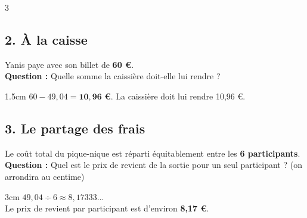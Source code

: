 \documentclass[a4paper]{book}
\begin{document}
{\begin{exerciceNote}{3}
        \subsection*{2. À la caisse}
        Yanis paye avec son billet de \textbf{60 €}. 
        \\ \textbf{Question :} Quelle somme la caissière doit-elle lui rendre ?

        \begin{ZoneReponse}{1.5cm}
            $60 - 49,04 = \mathbf{10,96}$ \textbf{\euro}. La caissière doit lui rendre 10,96 \euro.
        \end{ZoneReponse}
        
        \subsection*{3. Le partage des frais}
        Le coût total du pique-nique est réparti équitablement entre les \textbf{6 participants}.
        \\ \textbf{Question :} Quel est le prix de revient de la sortie pour un seul participant ? (on arrondira au centime)
        
        \begin{ZoneReponse}{3cm}
            $49,04 \div 6 \approx 8,17333...$ \\
            Le prix de revient par participant est d'environ \textbf{8,17 \euro}.
        \end{ZoneReponse}
    \end{exerciceNote}

}
\end{document}
